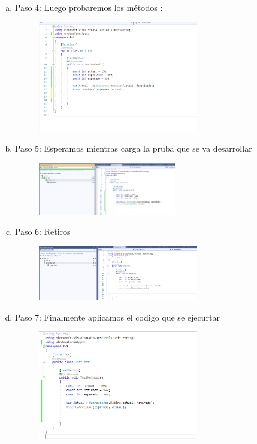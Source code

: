 \begin{enumerate}[1.]
\begin{enumerate}[a)]
\begin{figure}[H]
\begin{center}
		\end{center}
		\end{figure}
	\item Paso 4: Luego probaremos los métodos :
		\begin{figure}[H]
		\begin{center}
		\includegraphics[width=7cm]{./Imagenes/imp4}
		\end{center}
		\end{figure}
	\item Paso 5: Esperamos mientras carga la pruba que se va desarrollar
		\begin{figure}[H]
		\begin{center}
		\includegraphics[width=6cm]{./Imagenes/imp5}
		\end{center}
		\end{figure}
	\item Paso 6: Retiros
		\begin{figure}[H]
		\begin{center}
		\includegraphics[width=7cm]{./Imagenes/imp6}
		\end{center}
		\end{figure}
	\item Paso 7: Finalmente aplicamos el codigo que se ejecurtar
		\begin{figure}[H]
		\begin{center}
		\includegraphics[width=7cm]{./Imagenes/imp7}
		\end{center}
		\end{figure}
	\end{enumerate}
\end{enumerate}





